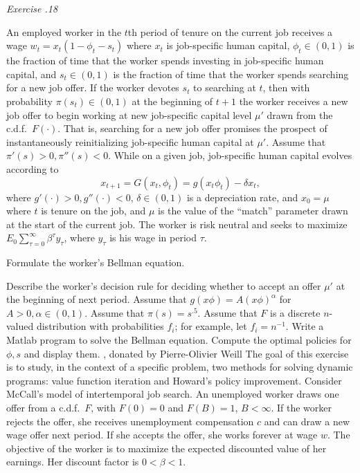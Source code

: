 \medskip\noindent
{\it Exercise \the\chapternum.18} 

\medskip\noindent
An employed  worker in the $t$th period of tenure
on the current job  receives a wage
$w_t = x_t(1 - \phi_t   - s_t)$  where $x_t$ is
job-specific human capital, $\phi_t \in (0,1)$ is
the fraction of time that the  worker spends investing in
job-specific human capital, and $s_t \in (0,1)$ is
the fraction of time that the worker spends searching for
a new job offer.    If the worker devotes $s_t$ to searching
 at  $t$, then with probability $\pi(s_t) \in (0,1)$ at the beginning of
$t+1$ the worker receives a new job offer  to begin working
at new job-specific capital level $\mu'$ drawn from
the c.d.f.\ $F(\cdot)$.  That is, searching for a new job
offer promises the prospect of instantaneously reinitializing
job-specific human capital at $\mu'$.   Assume that
$\pi'(s) >0, \pi''(s) < 0 $.  While on a given job,
job-specific human capital
evolves according to
$$ x_{t+1} = G(x_t, \phi_t) = g(x_t \phi_t) - \delta x_t   ,$$
where $g'(\cdot) > 0, g''(\cdot) < 0$, $\delta \in (0,1)$
is a depreciation rate,  and $x_0 = \mu$ where $t$ is tenure
on the job, and $\mu$ is the value of the ``match'' parameter
drawn at the start of the current job.   The worker is
risk neutral and seeks to maximize $E_0 \sum_{\tau=0}^\infty
\beta^\tau y_\tau$, where $y_\tau$ is his wage in period $\tau$.

\medskip
{}  Formulate the worker's Bellman equation.

\medskip
{} Describe the worker's decision rule
for deciding whether to accept an offer $\mu'$ at the beginning
of next period.
\medskip
{}  Assume that $g(x \phi) = A(x \phi)^\alpha$
for $A >0, \alpha \in (0,1)$.  Assume
that $\pi(s) = s^{.5}$. Assume that $F$ is a discrete
$n$-valued distribution with probabilities $f_i$; for example,
let $f_i = n^{-1}$.  Write a Matlab
program to solve the Bellman equation.  Compute the optimal
policies for $\phi, s$ and display them.
\medskip
{} , donated by Pierre-Olivier Weill
\medskip
\noindent The goal of this exercise is to study, in the context of
a specific problem, two methods for solving dynamic programs:
value function iteration and Howard's policy improvement. Consider
McCall's model of intertemporal job search. An unemployed worker
draws one offer from a c.d.f.\ $F$, with $F(0)=0$ and $F(B)=1$,
$B<\infty$. If the worker  rejects the offer, she receives
unemployment compensation $c$ and can draw a new wage offer next
period. If she accepts the offer, she works forever at wage $w$.
The objective of the worker is to maximize the expected discounted
value of her earnings. Her discount factor is $0<\beta<1$.\medskip

